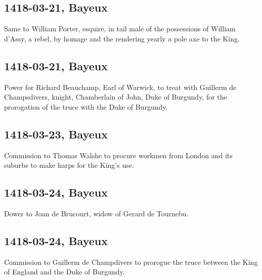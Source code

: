 \documentclass[a4paper,12pt,twoside]{book}
\begin{document}
                
                \subsection{1418-03-21, Bayeux}
                
                
                  Same to William Porter, esquire, in tail male of the possessions of William d'Assy, a rebel, by homage and the rendering yearly a pole axe to the King.
               
                
                \subsection{1418-03-21, Bayeux}
                
                
                  Power for Richard Beauchamp, Earl of Warwick, to treat with Guillerm de Champsdivers, knight, Chamberlain of John, Duke of Burgundy, for the prorogation of the truce with the Duke of Burgundy.
               
                
                \subsection{1418-03-23, Bayeux}
                
                
                  Commission to Thomas Walshe to procure workmen from London and its suburbs to make harps for the King's use.
               
                
                \subsection{1418-03-24, Bayeux}
                
                
                  Dower to Joan de Brucourt, widow of Gerard de Tournebu.
               
                
                \subsection{1418-03-24, Bayeux}
                
                
                  Commission to Guillerm de Champdivers to prorogue the truce between the King of England and the Duke of Burgundy.
               
\end{document}
